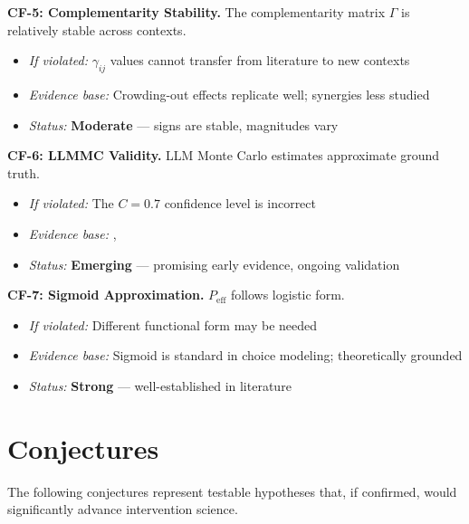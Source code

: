 \begin{tcolorbox}[colback=red!5!white, colframe=red!75!black,
    title=\textbf{Critical Foundations: What EIT Depends On}]
\textbf{CF-5: Complementarity Stability.} The complementarity matrix $\Gamma$ is relatively stable across contexts.
\begin{itemize}[nosep]
    \item \textit{If violated:} $\gamma_{ij}$ values cannot transfer from literature to new contexts
    \item \textit{Evidence base:} Crowding-out effects replicate well; synergies less studied
    \item \textit{Status:} \textbf{Moderate} --- signs are stable, magnitudes vary
\end{itemize}

\textbf{CF-6: LLMMC Validity.} LLM Monte Carlo estimates approximate ground truth.
\begin{itemize}[nosep]
    \item \textit{If violated:} The $C = 0.7$ confidence level is incorrect
    \item \textit{Evidence base:} \citet{zhu2024eliciting}, \citet{scientificreports2025llmpriors}
    \item \textit{Status:} \textbf{Emerging} --- promising early evidence, ongoing validation
\end{itemize}

\textbf{CF-7: Sigmoid Approximation.} $P_{\text{eff}}$ follows logistic form.
\begin{itemize}[nosep]
    \item \textit{If violated:} Different functional form may be needed
    \item \textit{Evidence base:} Sigmoid is standard in choice modeling; theoretically grounded
    \item \textit{Status:} \textbf{Strong} --- well-established in literature
\end{itemize}

\end{tcolorbox}


\section{Conjectures}
\label{sec:ie-conjectures}

The following conjectures represent testable hypotheses that, if confirmed, would significantly advance intervention science.

